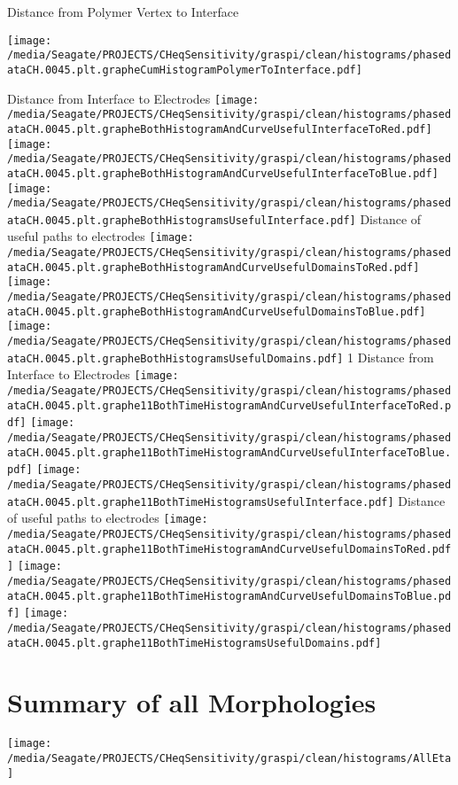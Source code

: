 \documentclass{article}
\begin{document}
\begin{center}
\parbox{0.33\textwidth}{\begin{scriptsize}Distance from Polymer Vertex to Interface\end{scriptsize}\newline
\texttt{[image: /media/Seagate/PROJECTS/CHeqSensitivity/graspi/clean/histograms/phasedataCH.0045.plt.grapheCumHistogramPolymerToInterface.pdf]}} \newline
Distance from Interface to Electrodes \newline
\texttt{[image: /media/Seagate/PROJECTS/CHeqSensitivity/graspi/clean/histograms/phasedataCH.0045.plt.grapheBothHistogramAndCurveUsefulInterfaceToRed.pdf]}
\texttt{[image: /media/Seagate/PROJECTS/CHeqSensitivity/graspi/clean/histograms/phasedataCH.0045.plt.grapheBothHistogramAndCurveUsefulInterfaceToBlue.pdf]}
\texttt{[image: /media/Seagate/PROJECTS/CHeqSensitivity/graspi/clean/histograms/phasedataCH.0045.plt.grapheBothHistogramsUsefulInterface.pdf]}\newline
Distance of useful paths to electrodes \newline
\texttt{[image: /media/Seagate/PROJECTS/CHeqSensitivity/graspi/clean/histograms/phasedataCH.0045.plt.grapheBothHistogramAndCurveUsefulDomainsToRed.pdf]}
\texttt{[image: /media/Seagate/PROJECTS/CHeqSensitivity/graspi/clean/histograms/phasedataCH.0045.plt.grapheBothHistogramAndCurveUsefulDomainsToBlue.pdf]}
\texttt{[image: /media/Seagate/PROJECTS/CHeqSensitivity/graspi/clean/histograms/phasedataCH.0045.plt.grapheBothHistogramsUsefulDomains.pdf]} 1 \newline
Distance from Interface to Electrodes \newline
\texttt{[image: /media/Seagate/PROJECTS/CHeqSensitivity/graspi/clean/histograms/phasedataCH.0045.plt.graphe11BothTimeHistogramAndCurveUsefulInterfaceToRed.pdf]}
\texttt{[image: /media/Seagate/PROJECTS/CHeqSensitivity/graspi/clean/histograms/phasedataCH.0045.plt.graphe11BothTimeHistogramAndCurveUsefulInterfaceToBlue.pdf]}
\texttt{[image: /media/Seagate/PROJECTS/CHeqSensitivity/graspi/clean/histograms/phasedataCH.0045.plt.graphe11BothTimeHistogramsUsefulInterface.pdf]}\newline
Distance of useful paths to electrodes \newline
\texttt{[image: /media/Seagate/PROJECTS/CHeqSensitivity/graspi/clean/histograms/phasedataCH.0045.plt.graphe11BothTimeHistogramAndCurveUsefulDomainsToRed.pdf]}
\texttt{[image: /media/Seagate/PROJECTS/CHeqSensitivity/graspi/clean/histograms/phasedataCH.0045.plt.graphe11BothTimeHistogramAndCurveUsefulDomainsToBlue.pdf]}
\texttt{[image: /media/Seagate/PROJECTS/CHeqSensitivity/graspi/clean/histograms/phasedataCH.0045.plt.graphe11BothTimeHistogramsUsefulDomains.pdf]}\newline
\end{center}
\newpage
\section{Summary of all Morphologies}
\texttt{[image: /media/Seagate/PROJECTS/CHeqSensitivity/graspi/clean/histograms/AllEta]}\newline
\end{document}
